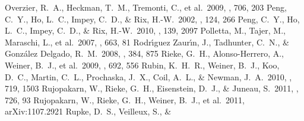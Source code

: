 \documentclass[apj]{emulateapj}
\begin{document}
\begin{thebibliography}{}
 Overzier, R.~A., Heckman,
  T.~M., Tremonti, C., et al.\ 2009, \apj, 706, 203
 Peng, C.~Y., Ho, L.~C., Impey,
  C.~D., \& Rix, H.-W.\ 2002, \aj, 124, 266
 Peng, C.~Y., Ho, L.~C., Impey,
  C.~D., \& Rix, H.-W.\ 2010, \aj, 139, 2097
 Polletta, M., Tajer, M.,
  Maraschi, L., et al.\ 2007, \apj, 663, 81
  Rodr{\'{\i}}guez Zaur{\'{\i}}n, J., Tadhunter, C.~N., \&
  Gonz{\'a}lez Delgado, R.~M.\ 2008, \mnras, 384, 875
 Rieke, G.~H., Alonso-Herrero, A.,
  Weiner, B.~J., et al.\ 2009, \apj, 692, 556
 Rubin, K.~H.~R., Weiner, B.~J.,
  Koo, D.~C., Martin, C.~L., Prochaska, J.~X., Coil, A.~L., \& Newman,
  J.~A.\ 2010, \apj, 719, 1503
 Rujopakarn, W.,
  Rieke, G.~H., Eisenstein, D.~J., \& Juneau, S.\ 2011, \apj, 726, 93
 Rujopakarn, W., Rieke, G.~H.,
  Weiner, B.~J., et al.\ 2011, arXiv:1107.2921
 Rupke, D.~S., Veilleux, S., \&

\end{thebibliography}
\end{document}
